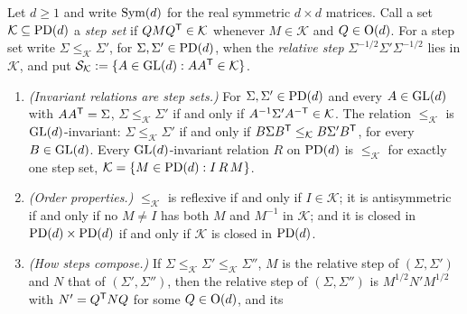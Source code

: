 \begin{proposition}
\label{prop:invariant-orders}
\leanok
Let $d \ge 1$ and write $\mathrm{Sym}(d)$ for the real symmetric $d \times d$ matrices. Call a set
$\mathcal K \subseteq \mathrm{PD}(d)$ a \emph{step set} if $QMQ^{\mathsf{T}} \in \mathcal K$ whenever $M \in \mathcal K$
and $Q \in \mathrm{O}(d)$. For a step set write $\Sigma \le_{\mathcal K} \Sigma'$, for
$\Sigma, \Sigma' \in \mathrm{PD}(d)$, when the \emph{relative step} $\Sigma^{-1/2}\Sigma'\Sigma^{-1/2}$ lies in
$\mathcal K$, and put $\mathcal S_{\mathcal K} := \{A \in \mathrm{GL}(d) : AA^{\mathsf{T}} \in \mathcal K\}$.
\begin{enumerate}
\item \emph{(Invariant relations are step sets.)} For $\Sigma, \Sigma' \in \mathrm{PD}(d)$ and every
$A \in \mathrm{GL}(d)$ with $AA^{\mathsf{T}} = \Sigma$, $\Sigma \le_{\mathcal K} \Sigma'$ if and only if
$A^{-1}\Sigma'A^{-\mathsf{T}} \in \mathcal K$. The relation $\le_{\mathcal K}$ is $\mathrm{GL}(d)$-invariant:
$\Sigma \le_{\mathcal K} \Sigma'$ if and only if $B\Sigma B^{\mathsf{T}} \le_{\mathcal K} B\Sigma'B^{\mathsf{T}}$, for
every $B \in \mathrm{GL}(d)$. Every $\mathrm{GL}(d)$-invariant relation $R$ on $\mathrm{PD}(d)$ is $\le_{\mathcal K}$ for
exactly one step set, $\mathcal K = \{M \in \mathrm{PD}(d) : I \,R\,M\}$.
\item \emph{(Order properties.)} $\le_{\mathcal K}$ is reflexive if and only if $I \in \mathcal K$; it is
antisymmetric if and only if no $M \ne I$ has both $M$ and $M^{-1}$ in $\mathcal K$; and it is closed in
$\mathrm{PD}(d) \times \mathrm{PD}(d)$ if and only if $\mathcal K$ is closed in $\mathrm{PD}(d)$.
\item \emph{(How steps compose.)} If $\Sigma \le_{\mathcal K} \Sigma' \le_{\mathcal K} \Sigma''$, $M$ is
the relative step of $(\Sigma, \Sigma')$ and $N$ that of $(\Sigma', \Sigma'')$, then the relative step
of $(\Sigma, \Sigma'')$ is $M^{1/2}N'M^{1/2}$ with $N' = Q^{\mathsf{T}}NQ$ for some $Q \in \mathrm{O}(d)$, and its

\end{enumerate}
\end{proposition}

